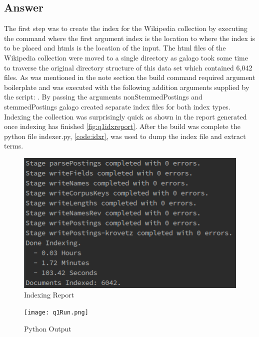 \documentclass[11pt]{article}
\begin{document}
\subsection{Answer} 
The first step was to create the index for the Wikipedia collection by executing the command \newline {} where the first argument index is the location to where the index is to be placed and htmls is the location of the input. The html files of the Wikipedia collection were moved to a single directory as galago took some time to traverse the original directory structure of this data set which contained 6,042 files. As was mentioned in the note section the build command required argument boilerplate and was executed with the following addition arguments supplied by the script: \newline {}. By passing the arguments nonStemmedPostings and stemmedPostings galago created separate index files for both index types. Indexing the collection was surprisingly quick as shown in the report generated once indexing has finished \autoref{fig:q1idxreport}. After the build was complete the python file indexer.py, \autoref{code:idxr}, was used to dump the index file and extract terms.
\begin{figure}[H]
\centering
\includegraphics[scale=0.8]{indexingReport.png}
\caption{Indexing Report}
\label{fig:q1idxreport}
\end{figure}
\begin{figure}[H]
\centering
\texttt{[image: q1Run.png]}
\caption{Python Output}
\label{fig:q1Run}
\end{figure}
\end{document}
